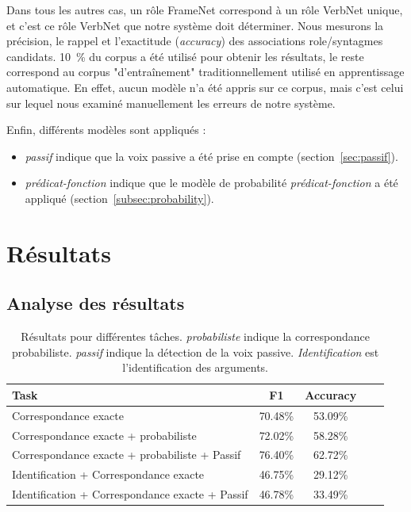 Dans tous les autres cas, un rôle FrameNet correspond à un rôle VerbNet unique,
et c'est ce rôle VerbNet que notre système doit déterminer. Nous mesurons la
précision, le rappel et l'exactitude (\emph{accuracy}) des associations
role/syntagmes candidats. 10~\% du corpus a été utilisé pour obtenir les
résultats, le reste correspond au corpus "d'entraînement" traditionnellement
utilisé en apprentissage automatique. En effet, aucun modèle n'a été appris sur
ce corpus, mais c'est celui sur lequel nous examiné manuellement les erreurs de
notre système.

Enfin, différents modèles sont appliqués :

\begin{itemize}

    \item \emph{passif} indique que la voix passive a été prise en compte
    (section~\ref{sec:passif}).

    \item \emph{prédicat-fonction} indique que le modèle de probabilité
    \emph{prédicat-fonction} a été appliqué (section~\ref{subsec:probability}).

\end{itemize}

\section{Résultats}

\subsection{Analyse des résultats}

\begin{table}[ht]
    \centering
    \begin{tabular}{lcccc}
        \toprule
        Task                                           & F1        & Accuracy \\
        \midrule
        Correspondance exacte                          & 70.48\%   & 53.09\%  \\
        Correspondance exacte + probabiliste            & 72.02\%   & 58.28\%  \\
        Correspondance exacte + probabiliste + Passif   & 76.40\%   & 62.72\%  \\
        \midrule
        Identification + Correspondance exacte                            & 46.75\%   & 29.12\%  \\
        Identification + Correspondance exacte + Passif & 46.78\%   & 33.49\%  \\
        \bottomrule
    \end{tabular}

    \caption{\label{table:results}Résultats pour différentes tâches. \emph{probabiliste} indique la correspondance probabiliste. \emph{passif} indique la détection de la voix passive. \emph{Identification} est l'identification des arguments.}

\end{table}

